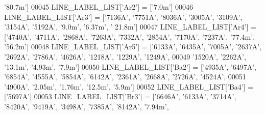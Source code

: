 \begin{DoxyCode}
{{       \textcolor{stringliteral}{'80.7m'}]
00045 LINE\_LABEL\_LIST[\textcolor{stringliteral}{'Ar2'}] = [\textcolor{stringliteral}{'7.0m'}]
00046 LINE\_LABEL\_LIST[\textcolor{stringliteral}{'Ar3'}] = [\textcolor{stringliteral}{'7136A'}, \textcolor{stringliteral}{'7751A'}, \textcolor{stringliteral}{'8036A'}, \textcolor{stringliteral}{'3005A'}, \textcolor{stringliteral}{'3109A'}, \textcolor{stringliteral}{'3154A'}, \textcolor{stringliteral}{'5192A'}, \textcolor{stringliteral}{'9.0m'}, \textcolor{stringliteral}{'6.37m'}, \textcolor{stringliteral}{'
      21.8m'}]
00047 LINE\_LABEL\_LIST[\textcolor{stringliteral}{'Ar4'}] = [\textcolor{stringliteral}{'4740A'}, \textcolor{stringliteral}{'4711A'}, \textcolor{stringliteral}{'2868A'}, \textcolor{stringliteral}{'7263A'}, \textcolor{stringliteral}{'7332A'}, \textcolor{stringliteral}{'2854A'}, \textcolor{stringliteral}{'7170A'}, \textcolor{stringliteral}{'7237A'}, \textcolor{stringliteral}{'77.4m'}, \textcolor{stringliteral}{
      '56.2m'}]
00048 LINE\_LABEL\_LIST[\textcolor{stringliteral}{'Ar5'}] = [\textcolor{stringliteral}{'6133A'}, \textcolor{stringliteral}{'6435A'}, \textcolor{stringliteral}{'7005A'}, \textcolor{stringliteral}{'2637A'}, \textcolor{stringliteral}{'2692A'}, \textcolor{stringliteral}{'2786A'}, \textcolor{stringliteral}{'4626A'}, \textcolor{stringliteral}{'1218A'}, \textcolor{stringliteral}{'1229A'}, \textcolor{stringliteral}{
      '1249A'}, 
00049                           \textcolor{stringliteral}{'1520A'}, \textcolor{stringliteral}{'2262A'}, \textcolor{stringliteral}{'13.1m'}, \textcolor{stringliteral}{'4.93m'}, \textcolor{stringliteral}{'7.9m'}]
00050 LINE\_LABEL\_LIST[\textcolor{stringliteral}{'Ba2'}] = [\textcolor{stringliteral}{'4935A'}, \textcolor{stringliteral}{'6497A'}, \textcolor{stringliteral}{'6854A'}, \textcolor{stringliteral}{'4555A'}, \textcolor{stringliteral}{'5854A'}, \textcolor{stringliteral}{'6142A'}, \textcolor{stringliteral}{'2361A'}, \textcolor{stringliteral}{'2668A'}, \textcolor{stringliteral}{'2726A'}, \textcolor{stringliteral}{
      '4524A'}, 
00051                           \textcolor{stringliteral}{'4900A'}, \textcolor{stringliteral}{'2.05m'}, \textcolor{stringliteral}{'1.76m'}, \textcolor{stringliteral}{'12.5m'}, \textcolor{stringliteral}{'5.9m'}]
00052 LINE\_LABEL\_LIST[\textcolor{stringliteral}{'Ba4'}] = [\textcolor{stringliteral}{'5697A'}]
00053 LINE\_LABEL\_LIST[\textcolor{stringliteral}{'Br3'}] = [\textcolor{stringliteral}{'6646A'}, \textcolor{stringliteral}{'6133A'}, \textcolor{stringliteral}{'3714A'}, \textcolor{stringliteral}{'8420A'}, \textcolor{stringliteral}{'9419A'}, \textcolor{stringliteral}{'3498A'}, \textcolor{stringliteral}{'7385A'}, \textcolor{stringliteral}{'8142A'}, \textcolor{stringliteral}{'7.94m'}, \textcolor{stringliteral}{
}}}
\end{DoxyCode}
